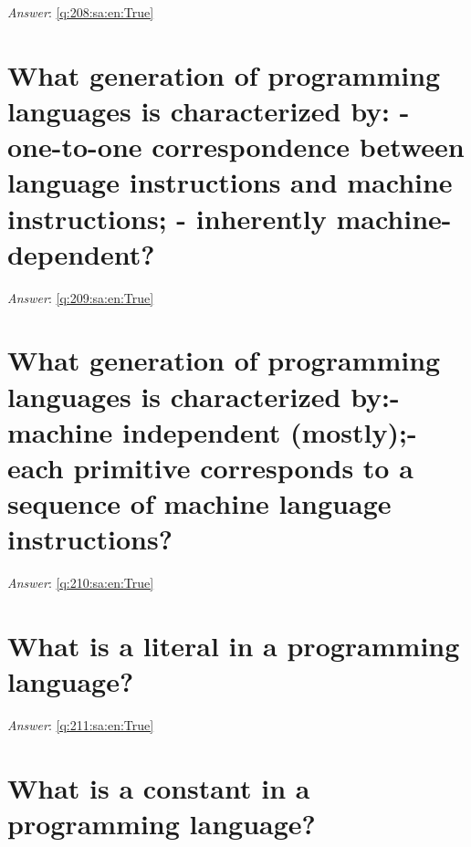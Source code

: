 \documentclass[a4paper,11pt,oneside]{book}
\begin{document}
\begin{sloppypar}
\textit{Answer}: \autoref{q:208:sa:en:True}



\section{What generation of programming languages is characterized by: - one-to-one correspondence between language instructions and machine instructions; - inherently machine-dependent?}

\label{q:209:sa:en:False}

\vspace{2cm}

\noindent\makebox[\textwidth]{\hrulefill}

\vspace{1cm}

\textit{Answer}: \autoref{q:209:sa:en:True}



\section{What generation of programming languages is characterized by:- machine independent (mostly);- each primitive corresponds to a sequence of machine language instructions?}

\label{q:210:sa:en:False}

\vspace{2cm}

\noindent\makebox[\textwidth]{\hrulefill}

\vspace{1cm}

\textit{Answer}: \autoref{q:210:sa:en:True}



\section{What is a literal in a programming language?}

\label{q:211:sa:en:False}

\vspace{2cm}

\noindent\makebox[\textwidth]{\hrulefill}

\vspace{1cm}

\textit{Answer}: \autoref{q:211:sa:en:True}



\section{What is a constant in a programming language?}


\end{sloppypar}
\end{document}
